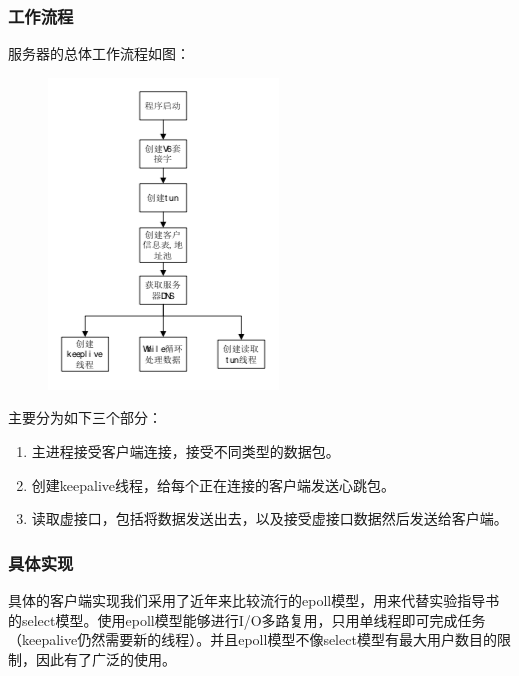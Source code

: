 \documentclass[paper=a4, fontsize=11pt, UTF8]{article} %
\begin{document}
\subsubsection{工作流程}
服务器的总体工作流程如图：
\begin{figure}[H]
    \centering
    \includegraphics[scale=0.7]{photos/server.png}
\end{figure}
主要分为如下三个部分：
\begin{enumerate}
    \item 主进程接受客户端连接，接受不同类型的数据包。
    \item 创建keepalive线程，给每个正在连接的客户端发送心跳包。
    \item 读取虚接口，包括将数据发送出去，以及接受虚接口数据然后发送给客户端。
\end{enumerate}

\subsubsection{具体实现}
具体的客户端实现我们采用了近年来比较流行的epoll模型，用来代替实验指导书的select模型。使用epoll模型能够进行I/O多路复用，只用单线程即可完成任务（keepalive仍然需要新的线程）。并且epoll模型不像select模型有最大用户数目的限制，因此有了广泛的使用。
\end{document}
